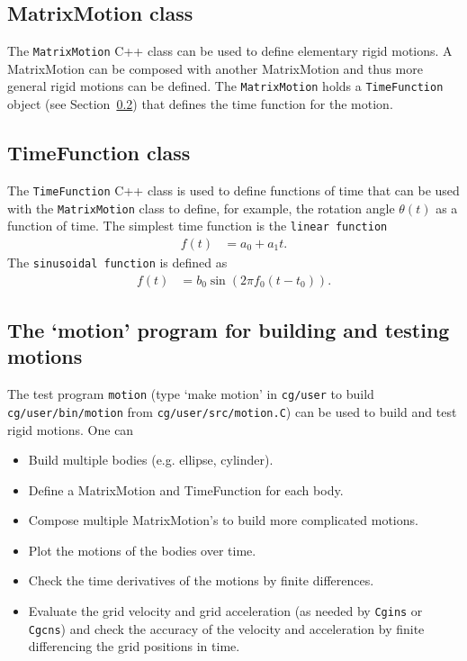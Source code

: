 \subsection{MatrixMotion class} \label{sec:MatrixMotion}

The {\tt MatrixMotion} C++ class can be used to define elementary rigid motions. A MatrixMotion
can be composed with another MatrixMotion and thus more general rigid motions can be defined.
The {\tt MatrixMotion} holds a {\tt TimeFunction} object (see Section~\ref{sec:TimeFunction}) that
defines the time function for the motion.



\subsection{TimeFunction class} \label{sec:TimeFunction}

The {\tt TimeFunction} C++ class is used to define functions of time that can be used with the
{\tt MatrixMotion} class to define, for example, the rotation angle $\theta(t)$ as a function of time.
The simplest time function is the {\tt linear function}
\begin{align}
  f(t) &= a_0 + a_1 t.
\end{align}
The {\tt sinusoidal function} is defined as
\begin{align}
  f(t) &= b_0 \sin( 2 \pi f_0( t-t_0)) .
\end{align}




\subsection{The `motion' program for building and testing motions} \label{sec:motion}

The test program {\tt motion} (type `make motion' in {\tt cg/user} to build 
{\tt cg/user/bin/motion} from {\tt cg/user/src/motion.C}) 
can be used to build and test rigid motions. One can
\begin{itemize}
  \item Build multiple bodies (e.g. ellipse, cylinder).
  \item Define a MatrixMotion and TimeFunction for each body.
  \item Compose multiple MatrixMotion's to build more complicated motions.
  \item Plot the motions of the bodies over time.
  \item Check the time derivatives of the motions by finite differences. 
  \item Evaluate the grid velocity and grid acceleration (as needed by {\tt Cgins} or {\tt Cgcns})
        and check the accuracy of the velocity and acceleration by finite differencing the grid positions
        in time. 
\end{itemize}




